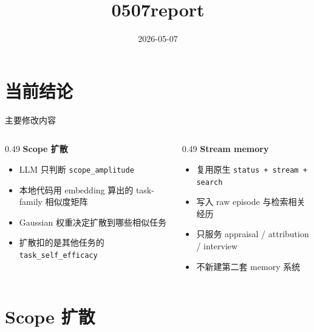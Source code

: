 \documentclass[aspectratio=169]{beamer}
\title[0507report]{0507report}
\subtitle{}
\date{2026-05-07}
\begin{document}
\begin{frame}
    \titlepage
\end{frame}

\section{当前结论}

\begin{frame}[t]{主要修改内容}
\small
\begin{columns}[T]
\begin{column}{0.49\textwidth}
\textbf{Scope 扩散}
\begin{itemize}
    \item LLM 只判断 \texttt{scope\_amplitude}
    \item 本地代码用 embedding 算出的 task-family 相似度矩阵
    \item Gaussian 权重决定扩散到哪些相似任务
    \item 扩散扣的是其他任务的 \texttt{task\_self\_efficacy}
\end{itemize}
\end{column}

\begin{column}{0.49\textwidth}
\textbf{Stream memory}
\begin{itemize}
    \item 复用原生 \texttt{status + stream + search}
    \item 写入 raw episode 与检索相关经历
    \item 只服务 appraisal / attribution / interview
    \item 不新建第二套 memory 系统
\end{itemize}
\end{column}
\end{columns}

\vspace{0.2cm}
\end{frame}

\section{Scope 扩散}
\end{document}
